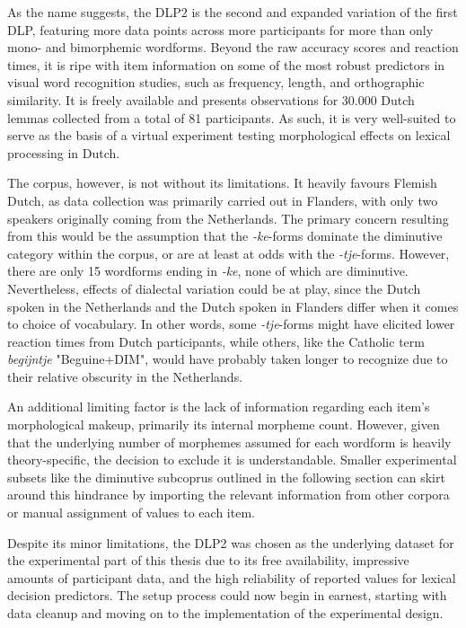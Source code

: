 As the name suggests, the DLP2 is the second and expanded variation of the first DLP, featuring more data points across more participants for more than only mono- and bimorphemic wordforms. Beyond the raw accuracy scores and reaction times, it is ripe with item information on some of the most robust predictors in visual word recognition studies, such as frequency, length, and orthographic similarity. It is freely available and presents observations for 30.000 Dutch lemmas collected from a total of 81 participants. As such, it is very well-suited to serve as the basis of a virtual experiment testing morphological effects on lexical processing in Dutch.

The corpus, however, is not without its limitations. It heavily favours Flemish Dutch, as data collection was primarily carried out in Flanders, with only two speakers originally coming from the Netherlands. The primary concern resulting from this would be the assumption that the \textit{-ke}-forms dominate the diminutive category within the corpus, or are at least at odds with the \textit{-tje}-forms. However, there are only 15 wordforms ending in \textit{-ke}, none of which are diminutive. Nevertheless, effects of dialectal variation could be at play, since the Dutch spoken in the Netherlands and the Dutch spoken in Flanders differ when it comes to choice of vocabulary. In other words, some \textit{-tje}-forms might have elicited lower reaction times from Dutch participants, while others, like the Catholic term \textit{begijntje} "Beguine+DIM", would have probably taken longer to recognize due to their relative obscurity in the Netherlands.

An additional limiting factor is the lack of information regarding each item's morphological makeup, primarily its internal morpheme count. However, given that the underlying number of morphemes assumed for each wordform is heavily theory-specific, the decision to exclude it is understandable. Smaller experimental subsets like the diminutive subcoprus outlined in the following section can skirt around this hindrance by importing the relevant information from other corpora or manual assignment of values to each item.

Despite its minor limitations, the DLP2 was chosen as the underlying dataset for the experimental part of this thesis due to its free availability, impressive amounts of participant data, and the high reliability of reported values for lexical decision predictors. The setup process could now begin in earnest, starting with data cleanup and moving on to the implementation of the experimental design.

